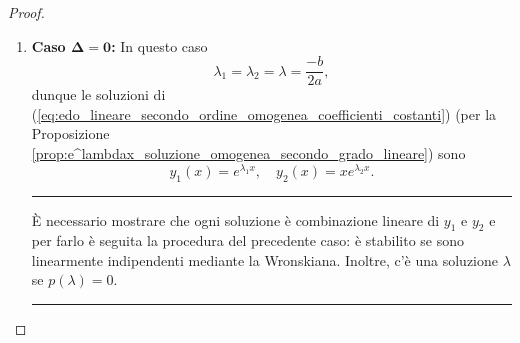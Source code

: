 \begin{proof}
\begin{enumerate}
		\addtocounter{footnote}{-1}
		
		
		\item \textbf{Caso $\boldsymbol{\Delta=0}$:} In questo caso
		\begin{equation*}
			\lambda_1=\lambda_2=\lambda=\frac{-b}{2a},
		\end{equation*}
		dunque le soluzioni di (\ref{eq:edo_lineare_secondo_ordine_omogenea_coefficienti_costanti}) (per la Proposizione \ref{prop:e^lambdax_soluzione_omogenea_secondo_grado_lineare}) sono
		\begin{equation*}
			y_1(x)=e^{\lambda_1 x},\quad y_2(x) = xe^{\lambda_2 x}.
		\end{equation*}
		\hrule\vspace{-2px}
		È necessario mostrare che ogni soluzione è combinazione lineare di $y_1$ e $y_2$ e per farlo è seguita la procedura del precedente caso: è stabilito se sono linearmente indipendenti mediante la Wronskiana. Inoltre, c'è una soluzione $\lambda$ se $p(\lambda)=0$.
		\hrule\vspace{2px}
		

\end{enumerate}
\end{proof}
